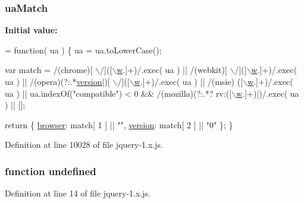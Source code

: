 \subsubsection[{\texorpdfstring{ua\+Match}{uaMatch}}]{ ua\+Match}\hypertarget{jquery-1_8x_8js_ab3da4eef6dbfe0aa1b00063be26f0cd7}{}\label{jquery-1_8x_8js_ab3da4eef6dbfe0aa1b00063be26f0cd7}
{\bfseries Initial value\+:}
\begin{DoxyCode}
= \textcolor{keyword}{function}( ua ) \{
    ua = ua.toLowerCase();

    var match = /(chrome)[ \(\backslash\)/]([\(\backslash\)\hyperlink{jquery-1_8x_8min_8js_a9721a992655f700bdc2e91ba68b71e26}{w}.]+)/.exec( ua ) ||
        /(webkit)[ \(\backslash\)/]([\(\backslash\)\hyperlink{jquery-1_8x_8min_8js_a9721a992655f700bdc2e91ba68b71e26}{w}.]+)/.exec( ua ) ||
        /(opera)(?:.*\hyperlink{swfupload_8js_ae393f33a5d8a662e31985f4512cf9283}{version}|)[ \(\backslash\)/]([\hyperlink{jquery-1_8x_8min_8js_a9721a992655f700bdc2e91ba68b71e26}{\(\backslash\)w}.]+)/.exec( ua ) ||
        /(msie) ([\(\backslash\)\hyperlink{jquery-1_8x_8min_8js_a9721a992655f700bdc2e91ba68b71e26}{w}.]+)/.exec( ua ) ||
        ua.indexOf(\textcolor{stringliteral}{"compatible"}) < 0 && /(mozilla)(?:.*? rv:([\(\backslash\)\hyperlink{jquery-1_8x_8min_8js_a9721a992655f700bdc2e91ba68b71e26}{w}.]+)|)/.exec( ua ) ||
        [];

    \textcolor{keywordflow}{return} \{
        \hyperlink{jquery-1_8x_8js_ad2e233c7f69c182810f01dc9d1a2d546}{browser}: match[ 1 ] || \textcolor{stringliteral}{""},
        \hyperlink{swfupload_8js_ae393f33a5d8a662e31985f4512cf9283}{version}: match[ 2 ] || \textcolor{stringliteral}{"0"}
    \};
\}
\end{DoxyCode}


Definition at line 10028 of file jquery-\/1.\+x.\+js.

\subsubsection[{\texorpdfstring{undefined}{undefined}}]{\setlength{\rightskip}{0pt plus 5cm}function undefined}\hypertarget{jquery-1_8x_8js_a08113a236cc18d2a9d5ce27e638012be}{}\label{jquery-1_8x_8js_a08113a236cc18d2a9d5ce27e638012be}


Definition at line 14 of file jquery-\/1.\+x.\+js.

